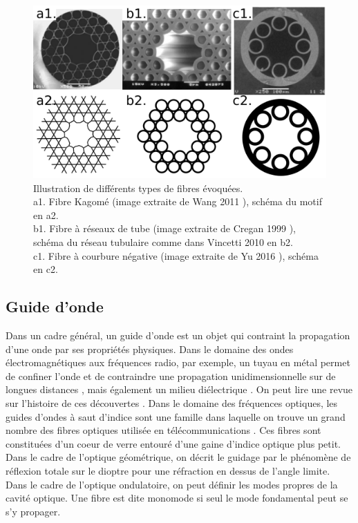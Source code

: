 \begin{figure}
\centering
\includegraphics[width=1\textwidth]{./files/fibers.svg.png}
\caption{Illustration de différents types de fibres évoquées.\\
a1. Fibre Kagomé (image extraite de Wang 2011 \cite{wang_low_2011}), schéma du motif en a2.\\
b1. Fibre à réseaux de tube (image extraite de Cregan 1999 \cite{cregan_single-mode_1999}), schéma du réseau tubulaire comme dans Vincetti 2010 \cite{vincetti_waveguiding_2010} en b2.\\
c1. Fibre à courbure négative (image extraite de Yu 2016 \cite{yu_negative_2016}), schéma en c2.\\}
\end{figure}

\subsection{Guide d'onde}

Dans un cadre général, un guide d'onde est un objet qui contraint la propagation d'une onde par ses propriétés physiques. Dans le domaine des ondes électromagnétiques aux fréquences radio, par exemple, un tuyau en métal permet de confiner l'onde et de contraindre une propagation unidimensionnelle sur de longues distances \cite{miller_low-loss_1953}, mais également un milieu diélectrique \cite{unger_circular_1957}. On peut lire une revue sur l'histoire de ces découvertes \cite{packard_origin_1984}.
Dans le domaine des fréquences optiques, les guides d'ondes à saut d'indice sont une famille dans laquelle on trouve un grand nombre des fibres optiques utilisée en télécommunications \cite{maurer_glass_1973}. Ces fibres sont constituées d'un coeur de verre entouré d'une gaine d'indice optique plus petit. Dans le cadre de l'optique géométrique, on décrit le guidage par le phénomène de réflexion totale sur le dioptre pour une réfraction en dessus de l'angle limite. Dans le cadre de l'optique ondulatoire, on peut définir les modes propres de la cavité optique. Une fibre est dite monomode si seul le mode fondamental peut se s'y propager.

